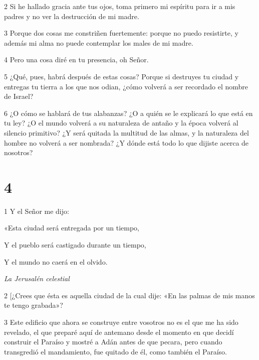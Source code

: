 \par 2 Si he hallado gracia ante tus ojos, toma primero mi espíritu para ir a mis padres y no ver la destrucción de mi madre.

\par 3 Porque dos cosas me constriñen fuertemente: porque no puedo resistirte, y además mi alma no puede contemplar los males de mi madre.

\par 4 Pero una cosa diré en tu presencia, oh Señor.

\par 5 ¿Qué, pues, habrá después de estas cosas? Porque si destruyes tu ciudad y entregas tu tierra a los que nos odian, ¿cómo volverá a ser recordado el nombre de Israel?

\par 6 ¿O cómo se hablará de tus alabanzas? ¿O a quién se le explicará lo que está en tu ley? ¿O el mundo volverá a su naturaleza de antaño y la época volverá al silencio primitivo? ¿Y será quitada la multitud de las almas, y la naturaleza del hombre no volverá a ser nombrada? ¿Y dónde está todo lo que dijiste acerca de nosotros?

\chapter{4}

\par 1 Y el Señor me dijo:

\par «Esta ciudad será entregada por un tiempo,

\par Y el pueblo será castigado durante un tiempo,

\par Y el mundo no caerá en el olvido.

\par \textit{La Jerusalén celestial}

\par 2 [¿Crees que ésta es aquella ciudad de la cual dije: «En las palmas de mis manos te tengo grabada»?

\par 3 Este edificio que ahora se construye entre vosotros no es el que me ha sido revelado, el que preparé aquí de antemano desde el momento en que decidí construir el Paraíso y mostré a Adán antes de que pecara, pero cuando transgredió el mandamiento, fue quitado de él, como también el Paraíso.


